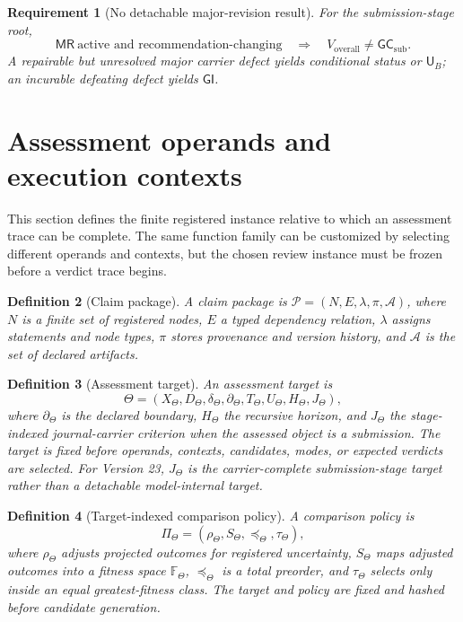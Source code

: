\documentclass[10pt]{article}
\newtheorem{definition}{Definition}[section]
\newtheorem{requirement}[definition]{Requirement}
\newcommand{\GI}{\mathsf{GI}}
\newcommand{\UB}{\mathsf{U}_B}
\newcommand{\Target}{\Theta}
\newcommand{\GCsub}{\mathsf{GC}_{\mathrm{sub}}}
\newcommand{\MR}{\mathsf{MR}}
\begin{document}
\begin{requirement}[No detachable major-revision result]
For the submission-stage root,
\[
  \MR\ \text{active and recommendation-changing}
  \quad\Longrightarrow\quad V_{\mathrm{overall}}\neq\GCsub.
\]
A repairable but unresolved major carrier defect yields conditional status or $\UB$; an incurable defeating defect yields $\GI$.
\end{requirement}


\section{Assessment operands and execution contexts}

This section defines the finite registered instance relative to which an assessment trace can be complete.  The same function family can be customized by selecting different operands and contexts, but the chosen review instance must be frozen before a verdict trace begins.

\begin{definition}[Claim package]
A claim package is $\mathcal P=(N,E,\lambda,\pi,\mathcal A)$, where $N$ is a finite set of registered nodes, $E$ a typed dependency relation, $\lambda$ assigns statements and node types, $\pi$ stores provenance and version history, and $\mathcal A$ is the set of declared artifacts.
\end{definition}

\begin{definition}[Assessment target]
An assessment target is
\[
  \Target=(X_\Target,D_\Target,\delta_\Target,\partial_\Target,
  T_\Target,U_\Target,H_\Target,J_\Target),
\]
where $\partial_\Target$ is the declared boundary, $H_\Target$ the recursive horizon, and $J_\Target$ the stage-indexed journal-carrier criterion when the assessed object is a submission.  The target is fixed before operands, contexts, candidates, modes, or expected verdicts are selected.  For Version 23, $J_\Target$ is the carrier-complete submission-stage target rather than a detachable model-internal target.
\end{definition}

\begin{definition}[Target-indexed comparison policy]
A comparison policy is
\[
  \Pi_\Target=(\rho_\Target,S_\Target,
  \preceq_\Target,\tau_\Target),
\]
where $\rho_\Target$ adjusts projected outcomes for registered uncertainty, $S_\Target$ maps adjusted outcomes into a fitness space $\mathbb F_\Target$, $\preceq_\Target$ is a total preorder, and $\tau_\Target$ selects only inside an equal greatest-fitness class.  The target and policy are fixed and hashed before candidate generation.
\end{definition}
\end{document}
